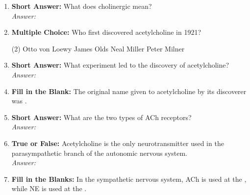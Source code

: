\begin{enumerate}[label=\textbf{Q3.4.\arabic*}]
    \item \textbf{Short Answer:} What does cholinergic mean? \\
        \textit{Answer:} %
    \item \textbf{Multiple Choice:} Who first discovered acetylcholine in 1921?
        \begin{tasks}[label=\textcolor{\documentTheme}{(\Alph*)}, item-format=\color{\documentTheme}, label-width=1.5em, item-indent=1.7em](2)
            \task Otto von Loewy
            \task James Olds
            \task Neal Miller
            \task Peter Milner
        \end{tasks}

    \item \textbf{Short Answer:} What experiment led to the discovery of acetylcholine? \\
        \textit{Answer:} %

    \item \textbf{Fill in the Blank:} The original name given to acetylcholine by its discoverer was \underline{\hspace{3cm}}.

    \item \textbf{Short Answer:} What are the two types of ACh receptors? \\
        \textit{Answer:} %

    \item \textbf{True or False:} Acetylcholine is the only neurotransmitter used in the parasympathetic branch of the autonomic nervous system. \\
        \textit{Answer:} %

    \item \textbf{Fill in the Blanks:} In the sympathetic nervous system, ACh is used at the \underline{\hspace{3cm}}, while NE is used at the \underline{\hspace{3cm}}.


\end{enumerate}
